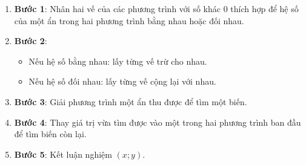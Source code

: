 \begin{enumerate}
\item \textbf{Bước 1}: Nhân hai vế của các phương trình với số khác $0$ thích hợp để hệ số của một ẩn trong hai phương trình bằng nhau hoặc đối nhau.
\item \textbf{Bước 2}:
\begin{itemize}
\item Nếu hệ số bằng nhau: lấy từng vế trừ cho nhau.
\item Nếu hệ số đối nhau: lấy từng vế cộng lại với nhau.
\end{itemize}
\item \textbf{Bước 3}: Giải phương trình một ẩn thu được để tìm một biến.
\item \textbf{Bước 4}: Thay giá trị vừa tìm được vào một trong hai phương trình ban đầu để tìm biến còn lại.
\item \textbf{Bước 5}: Kết luận nghiệm $(x; y)$.
\end{enumerate}
